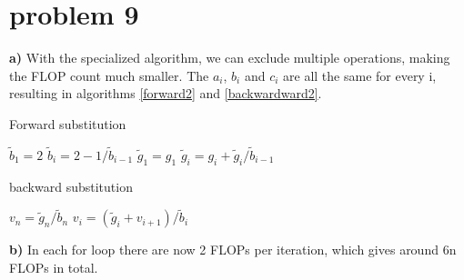 \documentclass[english,notitlepage]{revtex4-1}
\begin{document}
	\section*{problem 9}
	
	\textbf{a)} With the specialized algorithm, we can exclude multiple operations, making the FLOP count much smaller. The $a_i$, $b_i$ and $c_i$ are all the same for every i, resulting in algorithms \ref{forward2} and \ref{backwardward2}.
	
	\begin{algorithm}[H]
		\caption{Forward substitution}\label{forward2}
		\begin{algorithmic}
			\State $\tilde{b}_1 = 2$
			\State $\tilde{b}_i = 2-1/\tilde{b}_{i-1}$
			\EndFor
			\State $\tilde{g}_1 = g_1$
			\State $\tilde{g}_i = g_i +\tilde{g}_i/\tilde{b}_{i-1}$
			\EndFor
		\end{algorithmic}
	\end{algorithm}
	
	\begin{algorithm}[H]
		\caption{backward substitution}\label{backwardward2}
		\begin{algorithmic}
			\State $v_n = \tilde{g}_n/\tilde{b}_n$
			\For{$i = n-1, n-2, ..., 1$}
			\State $v_i = (\tilde{g}_i + v_{i+1})/\tilde{b}_{i}$
			\EndFor	
		\end{algorithmic}
	\end{algorithm}	

	\textbf{b)} In each for loop there are now 2 FLOPs per iteration, which gives around 6n FLOPs in total.

	
	
		
		

	
\end{document}
